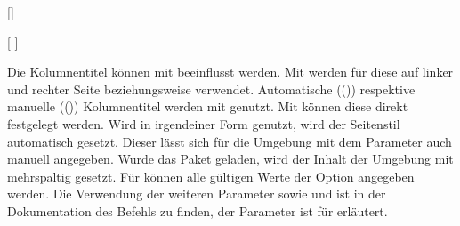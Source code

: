 \begin{Declaration*}{}
\begin{Declaration*}{}
\begin{Declaration*}{}
\begin{Declaration}{[]}
\begin{Declaration}{%
  [%
  ]%
}
\begin{Declaration}{}
\begin{Declaration}{}
\begin{Declaration}{%
}
\begin{Declaration}{%
}
\begin{Declaration}{}
\begin{Declaration}{%
}
\begin{Declaration}{}
\begin{Declaration}{}
\begin{Declaration}{}
Die Kolumnentitel können mit  
beeinflusst werden. Mit  werden 
für diese auf linker und rechter Seite  beziehungsweise
 verwendet.
Automatische (()) respektive 
manuelle (()) Kolumnentitel werden 
mit  genutzt. Mit 
 können 
diese direkt festgelegt werden. Wird  
in irgendeiner Form genutzt, wird der Seitenstil  
automatisch gesetzt. Dieser lässt sich für die Umgebung mit dem Parameter 
 auch manuell angegeben. Wurde das 
Paket  geladen, wird der Inhalt der Umgebung mit 
 mehrspaltig gesetzt. 
Für  können alle gültigen Werte der 
Option  angegeben werden. Die Verwendung der weiteren 
Parameter  sowie 
 und  ist 
in der Dokumentation des Befehls  zu finden, der Parameter 
 ist für  erläutert.
\end{Declaration}
\end{Declaration}
\end{Declaration}
\end{Declaration}
\end{Declaration}
\end{Declaration}
\end{Declaration}
\end{Declaration}
\end{Declaration}
\end{Declaration}
\end{Declaration}


\end{Declaration*}
\end{Declaration*}
\end{Declaration*}
